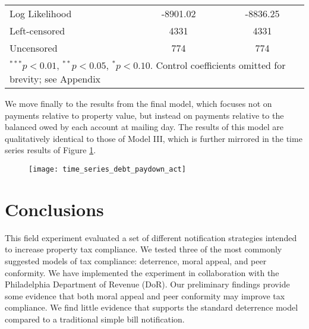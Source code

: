 \documentclass[12pt,titlepage]{article}
\begin{document}
\begin{table}
\begin{center}
\begin{tabular}{l c c }
Log Likelihood         & -8901.02         & -8836.25          \\
Left-censored          & 4331             & 4331              \\
Uncensored             & 774              & 774               \\
\hline
\multicolumn{3}{l}{\scriptsize{$^{***}p<0.01$, $^{**}p<0.05$, $^*p<0.10$. Control coefficients omitted for brevity; see Appendix}}
\end{tabular}
\end{center}
\end{table}

We move finally to the results from the final model, which focuses not
on payments relative to property value, but instead on payments
relative to the balanced owed by each account at mailing day. The
results of this model are qualitatively identical to those of Model
III, which is further mirrored in the time series results of Figure
\ref{drawdown_quart_act}.

\begin{figure}[htbp]
\begin{center}
\caption{}\label{drawdown_quart_act}
\texttt{[image: time\_series\_debt\_paydown\_act]}
\par\end{center}
\end{figure}

\newpage

\section{Conclusions}

This field experiment evaluated a set of different notification
strategies intended to increase property tax compliance. We tested three of the most commonly
suggested models of tax compliance: deterrence, moral appeal, and peer conformity.
We have implemented the experiment in collaboration with the Philadelphia Department of Revenue (DoR). 
Our preliminary findings provide some evidence that both moral appeal
and peer conformity may improve tax compliance. We find
little evidence that supports the standard deterrence model compared to a traditional simple bill notification.
\end{document}
